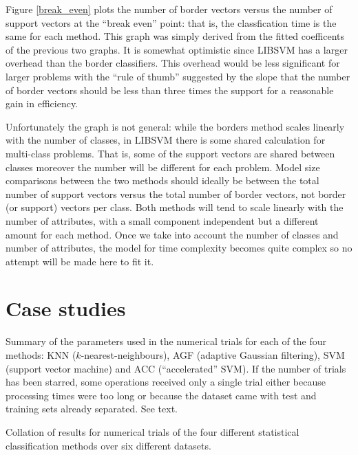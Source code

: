 Figure \ref{break_even} plots the number of border vectors versus the number
of support vectors at the ``break even'' point: that is, the classfication
time is the same for each method.
This graph was simply derived from the fitted coefficents of the previous
two graphs.
It is somewhat optimistic
since LIBSVM has a larger overhead than the border classifiers.
This overhead would be less significant for larger problems 
with the ``rule of thumb'' suggested by the slope 
that the number of border vectors should be less than three times the support
for a reasonable gain in efficiency.

Unfortunately the graph is not general: while the borders method scales linearly with
the number of classes, in LIBSVM there is some shared calculation for multi-class problems.
That is, some of the support vectors are shared between classes moreover the number will be different for each problem.
Model size comparisons between the two methods should ideally be between the total 
number of support vectors versus the total number of border vectors, not border (or support) vectors per class.
Both methods will tend to scale linearly with the number of attributes, with a small
component independent but a different amount for each method.
Once we take into account the number of classes and number of attributes, the
model for time complexity becomes quite complex so no attempt will be made here
to fit it.

\section{Case studies}

\label{results_section}

\begin{table}
	\caption{Summary of the parameters used in the numerical trials for each of the four methods: KNN ($k$-nearest-neighbours), AGF (adaptive Gaussian filtering), SVM (support vector machine) and ACC (``accelerated'' SVM).
	If the number of trials has been starred, some operations received only a single trial 
	either because processing times were too long or because the dataset came with
test and training sets already separated. See text.}
	\label{param}
	
\end{table}

\begin{table}
	\caption{Collation of results for numerical trials of the four different statistical classification methods over six different datasets.}
	\label{results}
	{\small
		
	}
\end{table}

